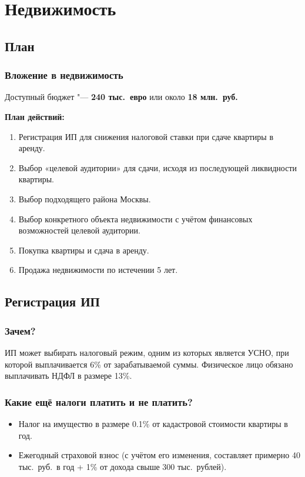 \documentclass{beamer}
\begin{document}
\section{Недвижимость}

	\subsection{План}
	
		\begin{frame}
			\frametitle{Вложение в недвижимость}
			
			Доступный бюджет "--- \textbf{240 тыс.\ евро} или около \textbf{18 млн.\ руб.}
			
			\vspace{\baselineskip}
			\textbf{План действий:}
			\begin{enumerate}
			\item Регистрация ИП для снижения налоговой ставки при сдаче квартиры в аренду.
			\item Выбор «целевой аудитории» для сдачи, исходя из последующей ликвидности квартиры.
			\item Выбор подходящего района Москвы.
			\item Выбор конкретного объекта недвижимости с учётом финансовых возможностей целевой аудитории.
			\item Покупка квартиры и сдача в аренду.
			\item Продажа недвижимости по истечении 5 лет.
			\end{enumerate}
		
		\end{frame}

	\subsection{Регистрация ИП}
	
		\begin{frame}
			\frametitle{Зачем?}
		
			ИП может выбирать налоговый режим, одним из которых является УСНО, при которой выплачивается 6\% от зарабатываемой суммы.
			Физическое лицо обязано выплачивать НДФЛ в размере 13\%.
		
		\end{frame}

		\begin{frame}
			\frametitle{Какие ещё налоги платить и не платить?}
			
			\begin{itemize}
			
			\item Налог на имущество в размере 0.1\% от кадастровой стоимости квартиры в год.
			
			\item Ежегодный страховой взнос (с учётом его изменения, составляет примерно 40 тыс.\ руб.\ в год + 1\% от дохода свыше 300 тыс.\ рублей).
			
			\end{itemize}
		
		
		\end{frame}
		
\end{document}

